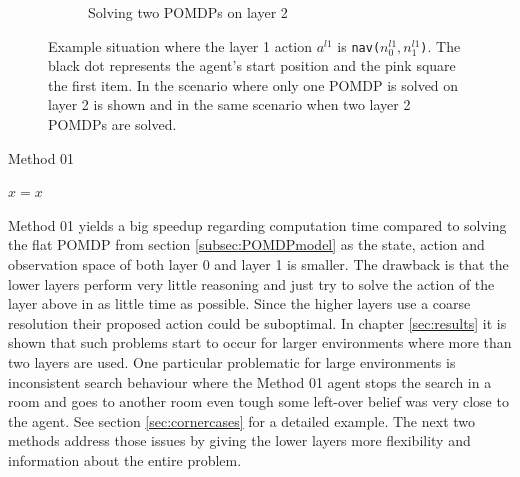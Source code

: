 \begin{figure}
\begin{subfigure}[b]{0.45\textwidth}
        \caption{Solving two POMDPs on layer 2}
        \label{subfig:shortroute}
    \end{subfigure}
    \caption{Example situation where the layer 1 action $a^{l1}$ is \texttt{nav($n_0^{l1},n_1^{l1}$)}. The black dot represents the agent's start position and the pink square the first item. In  the scenario where only one POMDP is solved on layer 2 is shown and in  the same scenario when two layer 2 POMDPs are solved.}
    \label{fig:two_terminal_states}
\end{figure}
%
\begin{algorithm}[htb!]
    \DontPrintSemicolon
    \caption{Method 01}
    \label{algo:M1}
        $x = x$    
\end{algorithm}

Method 01 yields a big speedup regarding computation time compared to solving the flat POMDP from section \ref{subsec:POMDPmodel} as the state, action and observation space of both layer 0 and layer 1 is smaller. The drawback is that the lower layers perform very little reasoning and just try to solve the action of the layer above in as little time as possible. Since the higher layers use a coarse resolution their proposed action could be suboptimal. In chapter \ref{sec:results} it is shown that such problems start to occur for larger environments where more than two layers are used. One particular problematic for large environments is inconsistent search behaviour where the Method 01 agent stops the search in a room and goes to another room even tough some left-over belief was very close to the agent. See section \ref{sec:cornercases} for a detailed example. 
The next two methods address those issues by giving the lower layers more flexibility and information about the entire problem.\\

